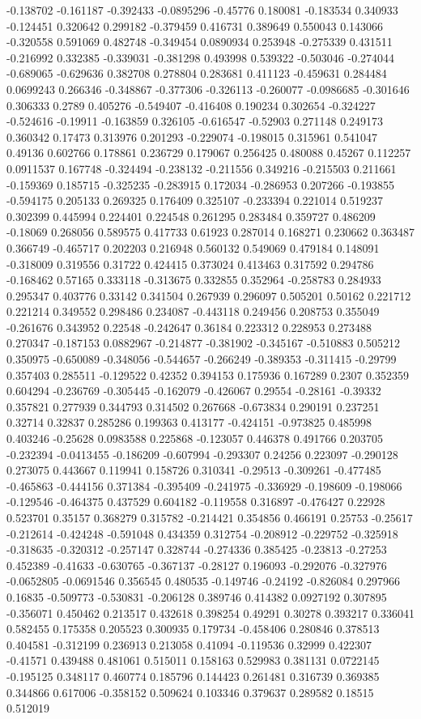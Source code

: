 -0.138702 -0.161187 -0.392433 -0.0895296 -0.45776 0.180081 -0.183534 0.340933 -0.124451 0.320642 0.299182 -0.379459 0.416731 0.389649 0.550043 0.143066 -0.320558 0.591069 0.482748 -0.349454 0.0890934 0.253948 -0.275339 0.431511 -0.216992 0.332385 -0.339031 -0.381298 0.493998 0.539322 -0.503046 -0.274044 -0.689065 -0.629636 0.382708 0.278804 0.283681 0.411123 -0.459631 0.284484 0.0699243 0.266346 -0.348867 -0.377306 -0.326113 -0.260077 -0.0986685 -0.301646 0.306333 0.2789 0.405276 -0.549407 -0.416408 0.190234 0.302654 -0.324227 -0.524616 -0.19911 -0.163859 0.326105 -0.616547 -0.52903 0.271148 0.249173 0.360342 0.17473 0.313976 0.201293 -0.229074 -0.198015 0.315961 0.541047 0.49136 0.602766 0.178861 0.236729 0.179067 0.256425 0.480088 0.45267 0.112257 0.0911537 0.167748 -0.324494 -0.238132 -0.211556 0.349216 -0.215503 0.211661 -0.159369 0.185715 -0.325235 -0.283915 0.172034 -0.286953 0.207266 -0.193855 -0.594175 0.205133 0.269325 0.176409 0.325107 -0.233394 0.221014 0.519237 0.302399 0.445994 0.224401 0.224548 0.261295 0.283484 0.359727 0.486209 -0.18069 0.268056 0.589575 0.417733 0.61923 0.287014 0.168271 0.230662 0.363487 0.366749 -0.465717 0.202203 0.216948 0.560132 0.549069 0.479184 0.148091 -0.318009 0.319556 0.31722 0.424415 0.373024 0.413463 0.317592 0.294786 -0.168462 0.57165 0.333118 -0.313675 0.332855 0.352964 -0.258783 0.284933 0.295347 0.403776 0.33142 0.341504 0.267939 0.296097 0.505201 0.50162 0.221712 0.221214 0.349552 0.298486 0.234087 -0.443118 0.249456 0.208753 0.355049 -0.261676 0.343952 0.22548 -0.242647 0.36184 0.223312 0.228953 0.273488 0.270347 -0.187153 0.0882967 -0.214877 -0.381902 -0.345167 -0.510883 0.505212 0.350975 -0.650089 -0.348056 -0.544657 -0.266249 -0.389353 -0.311415 -0.29799 0.357403 0.285511 -0.129522 0.42352 0.394153 0.175936 0.167289 0.2307 0.352359 0.604294 -0.236769 -0.305445 -0.162079 -0.426067 0.29554 -0.28161 -0.39332 0.357821 0.277939 0.344793 0.314502 0.267668 -0.673834 0.290191 0.237251 0.32714 0.32837 0.285286 0.199363 0.413177 -0.424151 -0.973825 0.485998 0.403246 -0.25628 0.0983588 0.225868 -0.123057 0.446378 0.491766 0.203705 -0.232394 -0.0413455 -0.186209 -0.607994 -0.293307 0.24256 0.223097 -0.290128 0.273075 0.443667 0.119941 0.158726 0.310341 -0.29513 -0.309261 -0.477485 -0.465863 -0.444156 0.371384 -0.395409 -0.241975 -0.336929 -0.198609 -0.198066 -0.129546 -0.464375 0.437529 0.604182 -0.119558 0.316897 -0.476427 0.22928 0.523701 0.35157 0.368279 0.315782 -0.214421 0.354856 0.466191 0.25753 -0.25617 -0.212614 -0.424248 -0.591048 0.434359 0.312754 -0.208912 -0.229752 -0.325918 -0.318635 -0.320312 -0.257147 0.328744 -0.274336 0.385425 -0.23813 -0.27253 0.452389 -0.41633 -0.630765 -0.367137 -0.28127 0.196093 -0.292076 -0.327976 -0.0652805 -0.0691546 0.356545 0.480535 -0.149746 -0.24192 -0.826084 0.297966 0.16835 -0.509773 -0.530831 -0.206128 0.389746 0.414382 0.0927192 0.307895 -0.356071 0.450462 0.213517 0.432618 0.398254 0.49291 0.30278 0.393217 0.336041 0.582455 0.175358 0.205523 0.300935 0.179734 -0.458406 0.280846 0.378513 0.404581 -0.312199 0.236913 0.213058 0.41094 -0.119536 0.32999 0.422307 -0.41571 0.439488 0.481061 0.515011 0.158163 0.529983 0.381131 0.0722145 -0.195125 0.348117 0.460774 0.185796 0.144423 0.261481 0.316739 0.369385 0.344866 0.617006 -0.358152 0.509624 0.103346 0.379637 0.289582 0.18515 0.512019 